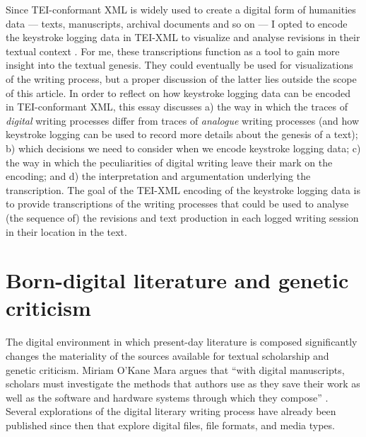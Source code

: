 \begin{paper}
Since TEI-conformant XML is widely used to create a digital form of
humanities data --- texts, manuscripts, archival documents and so on --- I
opted to encode the keystroke logging data in TEI-XML to visualize and
analyse revisions in their textual context \citep{burnard_what_2014}. For me, these transcriptions function as a tool to gain more insight into the textual genesis. They could eventually be used for visualizations of the writing process, but a proper discussion of the latter lies outside the scope of this article. In order to
reflect on how keystroke logging data can be encoded in TEI-conformant
XML, this essay discusses a) the way in which the traces of
\emph{digital} writing processes differ from traces of \emph{analogue} writing processes
(and how keystroke logging can be used to record more details about the
genesis of a text); b) which decisions we need to consider when we encode keystroke logging data; c) the way in which the peculiarities of
digital writing leave their mark on the encoding; and d) the
interpretation and argumentation underlying the transcription. The goal
of the TEI-XML encoding of the keystroke logging data is to provide
transcriptions of the writing processes that could be used to analyse
(the sequence of) the revisions and text production in each logged
writing session in their location in the text.

\section{Born-digital literature and genetic criticism}

The digital environment in which present-day literature is composed
significantly changes the materiality of the sources available for
textual scholarship and genetic criticism. Miriam O'Kane Mara argues
that ``with digital manuscripts, scholars must investigate the methods
that authors use as they save their work as well as the software and
hardware systems through which they compose'' \citep[345]{mara_nuala_2013}. Several explorations of the digital literary writing process have already been
published since then that explore digital files, file formats, and media types.


\end{paper}
